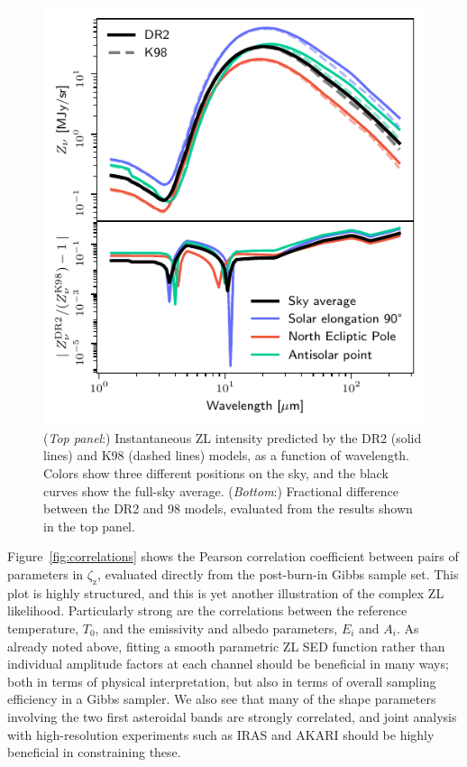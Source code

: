 \documentclass[twocolumn]{aa}
\begin{document}
\begin{figure}
    \centering
    \includegraphics[width=\columnwidth]{figs/zodi_intensity.pdf}
    \caption{(\textit{Top panel}:) Instantaneous ZL intensity
      predicted by the DR2 (solid lines) and K98 (dashed lines)
      models, as a function of wavelength. Colors show
      three different positions on the sky, and the black curves show
      the full-sky average. (\textit{Bottom}:) Fractional difference
      between the DR2 and 98 models, evaluated from the results
      shown in the top panel.
    }
    \label{fig:zodi-intensity}
\end{figure}

Figure~\ref{fig:correlations} shows the Pearson correlation
coefficient between pairs of parameters in $\zeta_{\mathrm{z}}$,
evaluated directly from the post-burn-in Gibbs sample set. This plot
is highly structured, and this is yet another illustration of the
complex ZL likelihood. Particularly strong are the correlations
between the reference temperature, $T_0$, and the emissivity and
albedo parameters, $E_i$ and $A_i$. As already noted above, fitting a
smooth parametric ZL SED function rather than individual amplitude
factors at each channel should be beneficial in many ways; both in
terms of physical interpretation, but also in terms of overall
sampling efficiency in a Gibbs sampler. We also see that many of the
shape parameters involving the two first asteroidal bands are strongly
correlated, and joint analysis with high-resolution experiments such
as IRAS and AKARI \citep{akari, akari2} should be highly beneficial in constraining these.
\end{document}
